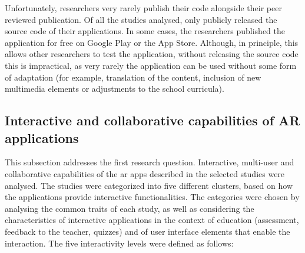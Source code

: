 Unfortunately, researchers very rarely publish their code alongside their peer reviewed publication. Of all the studies analysed, only \cite{ManriqueJuan2017APA, laviole2018nectar, mylonas2019educational, abriata2020building, dominguez2022collaborative, farella2022arete, wellmann2022open} publicly released the source code of their applications. In some cases, the researchers published the application for free on Google Play or the App Store. Although, in principle, this allows other researchers to test the application, without releasing the source code this is impractical, as very rarely the application can be used without some form of adaptation (for example, translation of the content, inclusion of new multimedia elements or adjustments to the school curricula).

\begin{figure}[htbp]	
	\begin{center}
	
	\captionsetup{font=small}
	\caption{\fontsize{10pt}{11pt}}
	\label{fig:software}
    \end{center}
\end{figure}

\subsection{Interactive and collaborative capabilities of AR applications}\label{sota:results:RQ1}

This subsection addresses the first research question. Interactive, multi-user and collaborative capabilities of the \gls{ar} apps described in the selected studies were analysed. The studies were categorized into five different clusters, based on how the applications provide interactive functionalities. The categories were chosen by analysing the common traits of each study, as well as considering the characteristics of interactive applications in the context of education (assessment, feedback to the teacher, quizzes) and of user interface elements that enable the interaction. The five interactivity levels were defined as follows:

